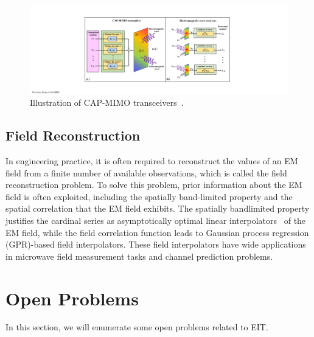\documentclass[journal,twocolumn]{IEEEtran}
\begin{document}
\begin{figure}
	\centering 
	\includegraphics[width=0.9\linewidth]{figures/CAPMIMO.pdf} 
	\caption{Illustration of CAP-MIMO transceivers~\cite{zhang2022pdma}.  }
	\label{fig:CAPMIMO}
\end{figure}


\subsection{Field Reconstruction}
In engineering practice, it is often required to reconstruct the values of an EM field from a finite number of available observations, which is called the field reconstruction problem. 
To solve this problem, prior information about the EM field is often exploited, including the spatially band-limited property and the spatial correlation that the EM field exhibits. 
The spatially bandlimited property justifies the cardinal series as asymptotically optimal linear interpolators~\cite{pizzo2022nyquist} of the EM field, while the field correlation function leads to Gaussian process regression (GPR)-based field interpolators. 
These field interpolators have wide applications in microwave field measurement tasks and channel prediction problems. 

\section{Open Problems}
In this section, we will enumerate some open problems related to EIT. 
\end{document}
